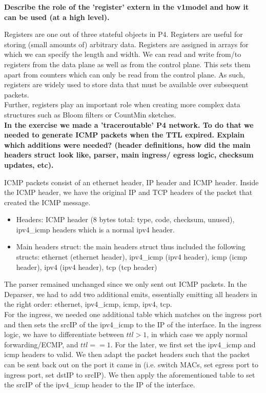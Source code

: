 \documentclass[11pt,oneside,a4paper]{article}
\begin{document}
\newpage

\noindent \textbf{Describe the role of the 'register' extern in the v1model and how it can be used (at a high level).}

Registers are one out of three stateful objects in P4. Registers are useful for storing (small amounts of) arbitrary data. Registers are assigned in arrays for which we can specify the length and width. We can read and write from/to registers from the data plane as well as from the control plane. This sets them apart from counters which can only be read from the control plane. As such, registers are widely used to store data that must be available over subsequent packets.\\
Further, registers play an important role when creating more complex data structures such as Bloom filters or CountMin sketches.\\


\noindent \textbf{In the exercise we made a 'traceroutable' P4 network. To do that we needed to generate ICMP packets when the TTL expired. Explain which additions were needed? (header definitions, how did the main headers struct look like, parser, main ingress/ egress logic, checksum updates, etc).}

ICMP packets consist of an ethernet header, IP header and ICMP header. Inside the ICMP header, we have the original IP and TCP headers of the packet that created the ICMP message.

\vspace{-\topsep}
\begin{itemize}
	\setlength{\itemsep}{0pt}
	\setlength{\parskip}{0pt}
	\item Headers: ICMP header (8 bytes total: type, code, checksum, unused), ipv4\_icmp headers which is a normal ipv4 header.
	\item Main headers struct: the main headers struct thus included the following structs: ethernet (ethernet header), ipv4\_icmp (ipv4 header), icmp (icmp header), ipv4 (ipv4 header), tcp (tcp header)
\end{itemize}
\vspace{-\topsep}

\noindent The parser remained unchanged since we only sent out ICMP packets. In the Deparser, we had to add two additional emits, essentially emitting all headers in the right order: ethernet, ipv4\_icmp, icmp, ipv4, tcp.\\
For the ingress, we needed one additional table which matches on the ingress port and then sets the srcIP of the ipv4\_icmp to the IP of the interface. In the ingress logic, we have to differentiate between $ttl > 1$, in which case we apply normal forwarding/ECMP, and $ttl == 1$. For the later, we first set the ipv4\_icmp and icmp headers to valid. We then adapt the packet headers such that the packet can be sent back out on the port it came in (i.e. switch MACs, set egress port to ingress port, set dstIP to srcIP). We then apply the aforementioned table to set the srcIP of the ipv4\_icmp header to the IP of the interface.
\end{document}
